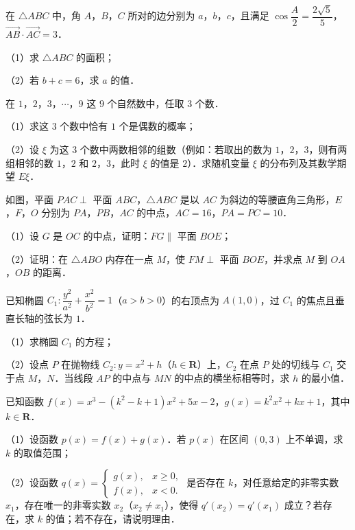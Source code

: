 \begin{question}
在 $\triangle ABC$ 中，角 $A$，$B$，$C$ 所对的边分别为 $a$，$b$，$c$，且满足 $\cos\dfrac A2=\dfrac{2\sqrt5}{5}$，$\overrightarrow{AB}\cdot\overrightarrow{AC}=3$．

（1）求 $\triangle ABC$ 的面积；

（2）若 $b+c=6$，求 $a$ 的值．

\end{question}
\begin{question}
在 $1$，$2$，$3$，$\cdots$，$9$ 这 $9$ 个自然数中，任取 $3$ 个数．

（1）求这 $3$ 个数中恰有 $1$ 个是偶数的概率；

（2）设 $\xi$ 为这 $3$ 个数中两数相邻的组数（例如：若取出的数为 $1$，$2$，$3$，则有两组相邻的数 $1$，$2$ 和 $2$，$3$，此时 $\xi$ 的值是 $2$）．求随机变量 $\xi$ 的分布列及其数学期望 $E\xi$．

\Needspace{0.4\textheight}
\end{question}
\begingroup
\renewenvironment{question}{\Needspace{0.5\textheight}}{}
\begin{question}
如图，平面 $PAC\perp$ 平面 $ABC$，$\triangle ABC$ 是以 $AC$ 为斜边的等腰直角三角形，$E$，$F$，$O$ 分别为 $PA$，$PB$，$AC$ 的中点，$AC=16$，$PA=PC=10$．

（1）设 $G$ 是 $OC$ 的中点，证明：$FG\parallel$ 平面 $BOE$；

（2）证明：在 $\triangle ABO$ 内存在一点 $M$，使 $FM\perp$ 平面 $BOE$，并求点 $M$ 到 $OA$，$OB$ 的距离．
\nopagebreak[4]
\begin{center}\end{center}
\nopagebreak[4]
\end{question}
\endgroup
\begin{question}
已知椭圆 $C_1:\dfrac{y^2}{a^2}+\dfrac{x^2}{b^2}=1$（$a>b>0$）的右顶点为 $A(1,0)$，过 $C_1$ 的焦点且垂直长轴的弦长为 $1$．

（1）求椭圆 $C_1$ 的方程；

（2）设点 $P$ 在抛物线 $C_2:y=x^2+h$（$h\in\mathbf R$）上，$C_2$ 在点 $P$ 处的切线与 $C_1$ 交于点 $M$，$N$．当线段 $AP$ 的中点与 $MN$ 的中点的横坐标相等时，求 $h$ 的最小值．

\end{question}
\begin{question}
已知函数 $f(x)=x^3-(k^2-k+1)x^2+5x-2$，$g(x)=k^2x^2+kx+1$，其中 $k\in\mathbf R$．

（1）设函数 $p(x)=f(x)+g(x)$．若 $p(x)$ 在区间 $(0,3)$ 上不单调，求 $k$ 的取值范围；

（2）设函数 $q(x)=\begin{cases}g(x),&x\geqslant0,\\f(x),&x<0.\end{cases}$ 是否存在 $k$，对任意给定的非零实数 $x_1$，存在唯一的非零实数 $x_2$（$x_2\neq x_1$），使得 $q'(x_2)=q'(x_1)$ 成立？若存在，求 $k$ 的值；若不存在，请说明理由．

\end{question}